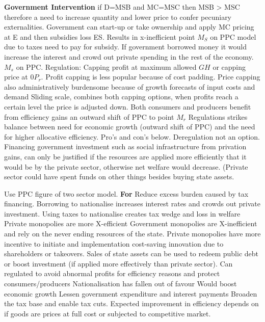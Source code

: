 \documentclass[12pt]{examnotes}
\begin{document}
{\bf Government Intervention}
\ra if D=MSB and MC=MSC then MSB > MSC therefore a need to increase quantity and lower price to confer pecuniary externalities.
 Government can start-up or take ownership and apply MC pricing at E and then subsidies loss ES. Results in x-inefficient point $M_S$ on PPC model due to taxes need to pay for subsidy.
 If government borrowed money it would increase the interest and crowd out private spending in the rest of the economy. $M_s$ on PPC.
 Regulation: Capping profit at maximum allowed $GH$ or capping price at $0P_r$.
\rna Profit capping is less popular because of cost padding.
\rna Price capping also administratively burdensome because of growth forecasts of input costs and demand
\rna Sliding scale, combines both capping options, when profits reach a certain level the price is adjusted down.
\rna Both consumers and producers benefit from efficiency gains an outward shift of PPC to point $M_r$
\rna Regulations strikes balance between need for economic growth  (outward shift of PPC) and the need for higher allocative efficiency.
\rna Pro's and con's below.
 Deregulation not an option.
\ra Financing government investment such as social infrastructure from privation gains, can only be justified if the resources are applied more efficiently that it would be by the private sector,  otherwise net welfare would decrease. (Private sector could have spent funds on other things besides buying state assets.

\ra Use PPC figure of two sector model.
{\bf For}
\ra Reduce excess burden caused by tax financing.
\ra Borrowing to nationalise increases interest rates and crowds out private investment. 
\ra Using taxes to nationalise creates tax wedge and loss in welfare
\ra Private monopolies are more X-efficient 
\ra Government monopolies are X-inefficient and rely on the never ending resources of the state.
\ra Private monopolies have more incentive to initiate and implementation cost-saving innovation due to shareholders or takeovers.
\ra Sales of state assets can be used to redeem public debt or boost investment (if applied more effectively than private sector).
\ra Can regulated to avoid abnormal profits for efficiency reasons and protect consumers/producers
\ra Nationalisation has fallen out of favour
\ra Would boost economic growth
\ra Lessen government expenditure and interest payments
\ra Broaden the tax base and enable tax cuts.
\ra Expected improvement in efficiency depends on if goods are prices at full cost or subjected to competitive market.
\end{document}

